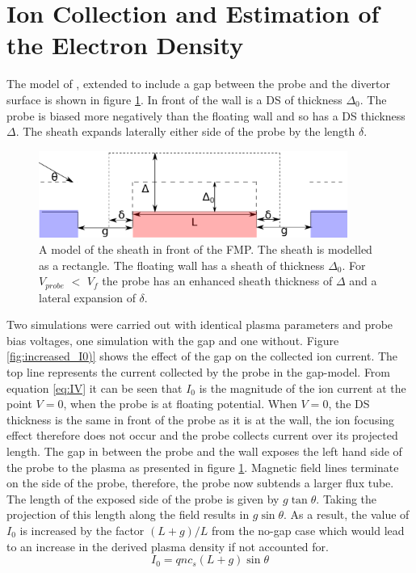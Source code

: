 \section{Ion Collection and Estimation of the Electron Density}
The model of \cite{Bergmann-2002}, extended to include a gap between the probe and the divertor surface is shown in figure \ref{fig:sheath_model}. In front of the wall is a DS of thickness $\Delta_0$. The probe is biased more negatively than the floating wall and so has a DS thickness $\Delta$. The sheath expands laterally either side of the probe by the length $\delta$.
\begin{figure}[]
	\centering
	\includegraphics[width=0.9\textwidth]{sheath_model1.pdf}
	\caption{A model of the sheath in front of the FMP. The sheath is modelled as a rectangle. The floating wall has a sheath of thickness $\Delta_0$. For $V_{probe}$ $<$ $V_f$ the probe has an enhanced sheath thickness of $\Delta$ and a lateral expansion of $\delta$. }
	\label{fig:sheath_model}
\end{figure}
Two simulations were carried out with identical plasma parameters and probe bias voltages, one simulation with the gap and one without. Figure \ref{fig:increased_I0)} shows the effect of the gap on the collected ion current. The top line represents the current collected by the probe in the gap-model. From equation \ref{eq:IV} it can be seen that $I_0$ is the magnitude of the ion current at the point $V = 0$, when the probe is at floating potential. When $V= 0$, the DS thickness is the same in front of the probe as it is at the wall, the ion focusing effect therefore does not occur and the probe collects current over its projected length. The gap in between the probe and the wall exposes the left hand side of the probe to the plasma as presented in figure \ref{fig:sheath_model}. Magnetic field lines terminate on the side of the probe, therefore, the probe now subtends a larger flux tube. The length of the exposed side of the probe is given by $g \tan \theta$. Taking the projection of this length along the field results in $g \sin \theta$. As a result, the value of $I_0$ is increased by the factor $(L+g)/L$ from the no-gap case which would lead to an increase in the derived plasma density if not accounted for.
\begin{equation}
I_0 = q n c_s(L+g)\sin{\theta}
\end{equation}

